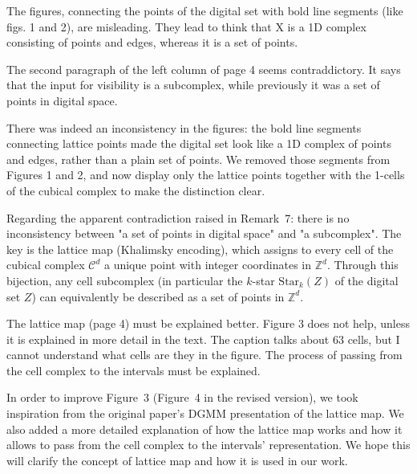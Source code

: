 \documentclass[10pt,french]{letter}
\begin{document}
  \begin{remark}
    The figures, connecting the points of the digital set with bold line segments (like figs. 1 and 2),
    are misleading. They lead to think that X is a 1D complex consisting of points and edges, whereas
    it is a set of points.
  \end{remark}
  \begin{remark}
    The second paragraph of the left column of page 4 seems contraddictory. It says that the input for
    visibility is a subcomplex, while previously it was a set of points in digital space.
  \end{remark}
  \begin{response}
    There was indeed an inconsistency in the figures: the bold line segments connecting lattice
    points made the digital set look like a 1D complex of points and edges, rather than a plain set
    of points. We removed those segments from Figures 1 and 2, and now display only the lattice
    points together with the 1-cells of the cubical complex to make the distinction clear.

    Regarding the apparent contradiction raised in Remark~7:
    there is no inconsistency between "a set of points in digital space" and "a subcomplex". The
    key is the lattice map (Khalimsky encoding), which assigns to every cell of the cubical
    complex $\mathcal{C}^d$ a unique point with integer coordinates in $\mathbb{Z}^d$. Through this
    bijection, any cell subcomplex (in particular the $k$-star $\mathrm{Star}_k(Z)$ of the digital
    set $Z$) can equivalently be described as a set of points in $\mathbb{Z}^d$.
  \end{response}


  \begin{remark}
    The lattice map (page 4) must be explained better. Figure 3 does not help, unless it is
    explained in more detail in the text. The caption talks about 63 cells, but I cannot
    understand what cells are they in the figure. The process of passing from the cell complex
    to the intervals must be explained.
  \end{remark}
  \begin{response}
    In order to improve Figure~3 (Figure~4 in the revised version), we took inspiration from
    the original paper's DGMM presentation of the lattice map. We also added a more detailed
    explanation of how the lattice map works and how it allows to pass from the cell complex
    to the intervals' representation. We hope this will clarify the concept of lattice map
    and how it is used in our work.
  \end{response}
\end{document}
